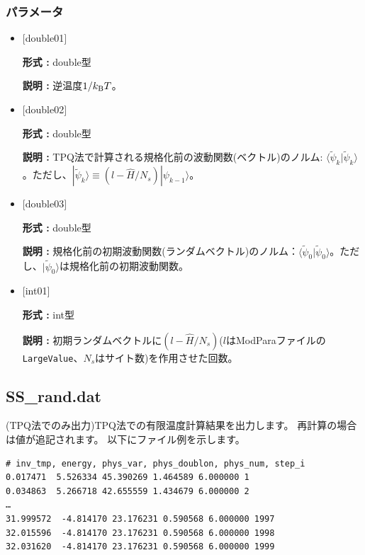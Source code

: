 \subsubsection{パラメータ}
 \begin{itemize}

  \item  $[$double01$]$
  
 {\bf 形式 :} double型

{\bf 説明 :} 逆温度$1/{k_{\rm B}T}$。
 
  \item $[$double02$]$

 {\bf 形式 :} double型 

{\bf 説明 :}  TPQ法で計算される規格化前の波動関数(ベクトル)のノルム:
 $\langle \tilde{\psi}_{k} |\tilde{\psi}_{k}\rangle$。ただし、$|\tilde{\psi}_{k}\rangle \equiv(l-\hat{H}/N_{s})|\psi_{k-1}\rangle$。

  \item $[$double03$]$

 {\bf 形式 :} double型 

{\bf 説明 :} 規格化前の初期波動関数(ランダムベクトル)のノルム：$\langle \tilde{\psi}_{0} |\tilde{\psi}_{0}\rangle$。ただし、$|\tilde{\psi}_{0}\rangle$は規格化前の初期波動関数。

  \item $[$int01$]$

 {\bf 形式 :} int型 

{\bf 説明 :} 初期ランダムベクトルに$(l-\hat{H}/N_{s})$($l$はModParaファイルの\verb|LargeValue|、$N_{s}$はサイト数)を作用させた回数。

 \end{itemize}


\newpage
\subsection{SS\_rand.dat}
\label{Subsec:ssrand}
(TPQ法でのみ出力)TPQ法での有限温度計算結果を出力します。
再計算の場合は値が追記されます。
以下にファイル例を示します。\\
\begin{minipage}{15cm}
\begin{screen}
\begin{verbatim}
# inv_tmp, energy, phys_var, phys_doublon, phys_num, step_i
0.017471  5.526334 45.390269 1.464589 6.000000 1
0.034863  5.266718 42.655559 1.434679 6.000000 2
…
31.999572  -4.814170 23.176231 0.590568 6.000000 1997
32.015596  -4.814170 23.176231 0.590568 6.000000 1998
32.031620  -4.814170 23.176231 0.590568 6.000000 1999
\end{verbatim}
\end{screen}
\end{minipage}

